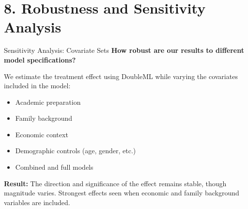 \documentclass[aspectratio=169]{beamer}
\begin{document}
\section{8. Robustness and Sensitivity Analysis}

\begin{frame}{Sensitivity Analysis: Covariate Sets}
\textbf{How robust are our results to different model specifications?}
\vspace{10pt}

We estimate the treatment effect using DoubleML while varying the covariates included in the model:

\begin{itemize}
    \item Academic preparation
    \item Family background
    \item Economic context
    \item Demographic controls (age, gender, etc.)
    \item Combined and full models
\end{itemize}

\vspace{5pt}
\textbf{Result:} The direction and significance of the effect remains stable, though magnitude varies. Strongest effects seen when economic and family background variables are included.
\end{frame}
\end{document}
